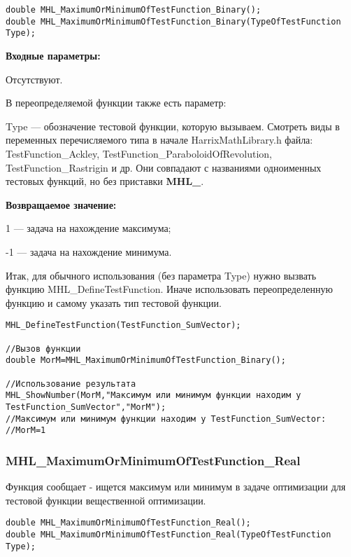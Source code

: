 \documentclass[a4paper,12pt]{article}
\begin{document}
\begin{lstlisting}[label=code_syntax_MHL_MaximumOrMinimumOfTestFunction_Binary,caption=Синтаксис]
double MHL_MaximumOrMinimumOfTestFunction_Binary();
double MHL_MaximumOrMinimumOfTestFunction_Binary(TypeOfTestFunction Type);
\end{lstlisting}

\textbf{Входные параметры:}

Отсутствуют.

В переопределяемой функции также есть параметр:
  
Type --- обозначение тестовой функции, которую вызываем.
Смотреть виды в переменных перечисляемого типа в начале HarrixMathLibrary.h файла: TestFunction\_Ackley, TestFunction\_ParaboloidOfRevolution, TestFunction\_Rastrigin и др. Они совпадают с названиями одноименных тестовых функций, но без приставки \textbf{MHL\_}.

\textbf{Возвращаемое значение:}
 
1 --- задача на нахождение максимума;

-1 --- задача на нахождение минимума.

Итак, для обычного использования (без параметра Type) нужно вызвать функцию MHL\_DefineTestFunction. Иначе использовать переопределенную функцию и самому указать тип тестовой функции.


\begin{lstlisting}[label=code_use_MHL_MaximumOrMinimumOfTestFunction_Binary,caption=Пример использования]
MHL_DefineTestFunction(TestFunction_SumVector);

//Вызов функции
double MorM=MHL_MaximumOrMinimumOfTestFunction_Binary();

//Использование результата
MHL_ShowNumber(MorM,"Максимум или минимум функции находим у TestFunction_SumVector","MorM");
//Максимум или минимум функции находим у TestFunction_SumVector:
//MorM=1
\end{lstlisting}

\subsubsection{MHL\_MaximumOrMinimumOfTestFunction\_Real}\label{MHL_MaximumOrMinimumOfTestFunction_Real}

	Функция сообщает - ищется максимум или минимум в задаче оптимизации для тестовой функции вещественной оптимизации.


\begin{lstlisting}[label=code_syntax_MHL_MaximumOrMinimumOfTestFunction_Real,caption=Синтаксис]
double MHL_MaximumOrMinimumOfTestFunction_Real();
double MHL_MaximumOrMinimumOfTestFunction_Real(TypeOfTestFunction Type);
\end{lstlisting}
\end{document}
